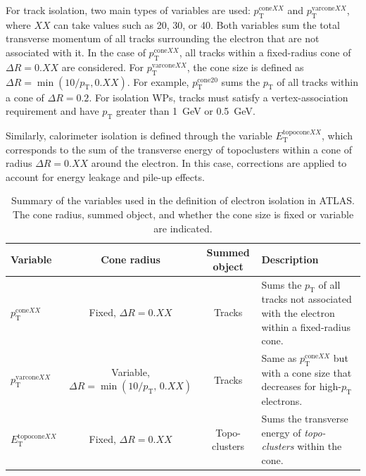 For track isolation, two main types of variables are used: $p_{\mathrm{T}}^{\mathrm{cone}XX}$ and $p_{\mathrm{T}}^{\mathrm{varcone}XX}$, where $XX$ can take values such as 20, 30, or 40. Both variables sum the total transverse momentum of all tracks surrounding the electron that are not associated with it. In the case of $p_{\mathrm{T}}^{\mathrm{cone}XX}$, all tracks within a fixed-radius cone of $\Delta R = 0.XX$ are considered. For $p_{\mathrm{T}}^{\mathrm{varcone}XX}$, the cone size is defined as $\Delta R = \min(10/p_{\mathrm{T}}, 0.XX)$. For example, $p_{\mathrm{T}}^{\mathrm{cone20}}$ sums the $p_{\mathrm{T}}$ of all tracks within a cone of $\Delta R = 0.2$. For isolation WPs, tracks must satisfy a vertex-association requirement and have $p_{\mathrm{T}}$ greater than 1~GeV or 0.5~GeV.

Similarly, calorimeter isolation is defined through the variable $E_{\mathrm{T}}^{\mathrm{topocone}XX}$, which corresponds to the sum of the transverse energy of topoclusters within a cone of radius $\Delta R = 0.XX$ around the electron. In this case, corrections are applied to account for energy leakage and pile-up effects.

\begin{table}[htbp]
\scriptsize
\centering
\label{tab:electron_isolation_vars}
\begin{tabular}{lccp{3cm}}
\hline
\textbf{Variable} & \textbf{Cone radius} & \textbf{Summed object} & \textbf{Description} \\
\hline
$p_{\mathrm{T}}^{\mathrm{cone}XX}$ & Fixed, $\Delta R = 0.XX$ & Tracks & Sums the $p_{\mathrm{T}}$ of all tracks not associated with the electron within a fixed-radius cone. \\
$p_{\mathrm{T}}^{\mathrm{varcone}XX}$ & Variable, $\Delta R = \min(10/p_{\mathrm{T}},\,0.XX)$ & Tracks & Same as $p_{\mathrm{T}}^{\mathrm{cone}XX}$ but with a cone size that decreases for high-$p_{\mathrm{T}}$ electrons. \\
$E_{\mathrm{T}}^{\mathrm{topocone}XX}$ & Fixed, $\Delta R = 0.XX$ & Topo-clusters & Sums the transverse energy of \textit{topo-clusters} within the cone. \\
\hline
\end{tabular}
\caption{Summary of the variables used in the definition of electron isolation in ATLAS. The cone radius, summed object, and whether the cone size is fixed or variable are indicated.}
\end{table}


